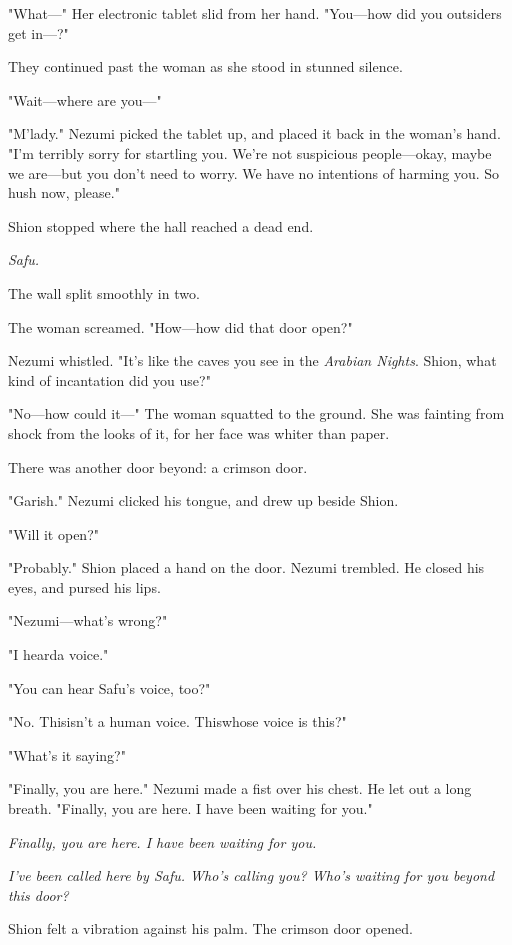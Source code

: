 "What---" Her electronic tablet slid from her hand. "You---how did you
outsiders get in---?"

They continued past the woman as she stood in stunned silence.

"Wait---where are you---"

"M'lady." Nezumi picked the tablet up, and placed it back in the woman's
hand. "I'm terribly sorry for startling you. We're not suspicious
people---okay, maybe we are---but you don't need to worry. We have no
intentions of harming you. So hush now, please."

Shion stopped where the hall reached a dead end.

\emph{Safu.}

The wall split smoothly in two.

The woman screamed. "How---how did that door open?"

Nezumi whistled. "It's like the caves you see in the \emph{Arabian Nights}.
Shion, what kind of incantation did you use?"

"No---how could it---" The woman squatted to the ground. She was fainting
from shock from the looks of it, for her face was whiter than paper.

There was another door beyond: a crimson door.

"Garish." Nezumi clicked his tongue, and drew up beside Shion.~

"Will it open?"

"Probably." Shion placed a hand on the door. Nezumi trembled. He closed
his eyes, and pursed his lips.

"Nezumi---what's wrong?"

"I heard\el a voice."

"You can hear Safu's voice, too?"

"No. This\el isn't a human voice. This\el whose voice is this?"

"What's it saying?"

"\el Finally, you are here." Nezumi made a fist over his chest. He let
out a long breath. "Finally, you are here. I have been waiting for you."

\emph{Finally, you are here. I have been waiting for you.}

\myspace

\emph{I've been called here by Safu. Who's calling you? Who's waiting for you
beyond this door?}

Shion felt a vibration against his palm. The crimson door opened.

